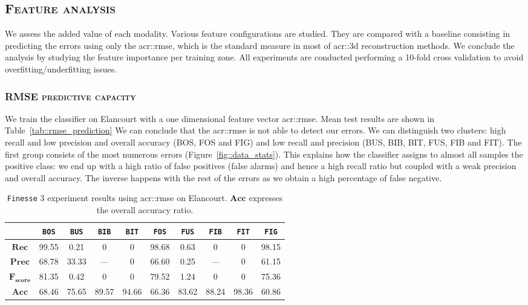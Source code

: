     \subsection{\textsc{Feature analysis}}
        We assess the added value of each modality. Various feature configurations are studied.
        They are compared with a baseline consisting in predicting the errors using only the \gls{acr::rmse}, which is the standard measure in most of \gls{acr::3d} reconstruction methods.
        We conclude the analysis by studying the feature importance per training zone.
        All experiments are conducted performing a 10-fold cross validation to avoid overfitting/underfitting issues.

        \subsubsection{\textsc{RMSE predictive capacity}}
            We train the classifier on Elancourt with a one dimensional feature vector \gls{acr::rmse}. Mean test results are shown in Table~\ref{tab::rmse_prediction} We can conclude that the \gls{acr::rmse} is not able to detect our  errors.  We can distinguish two clusters: high recall and low precision and overall accuracy (BOS, FOS and FIG) and low recall and precision (BUS, BIB, BIT, FUS, FIB and FIT). The first group consists of the most numerous errors (Figure~\ref{fig::data_stats}). This explains how the classifier assigns to almost all samples the positive class: we end up with a high ratio of false positives (false alarms) and hence a high recall ratio but coupled with a weak precision and overall accuracy. The inverse happens with the rest of the errors as we obtain a high percentage of false negative.
            \begin{table}[h]
                \begin{tabular}{c c c c c c c c c c}
                    \toprule
                    & \texttt{BOS} & \texttt{BUS} & \texttt{BIB} & \texttt{BIT} & \texttt{FOS} & \texttt{FUS} & \texttt{FIB} & \texttt{FIT} & \texttt{FIG} \\
                    \midrule
                    $\bm{Rec}$ & 99.55 & 0.21 & 0 & 0 & 98.68 & 0.63 & 0 & 0 & 98.15 \\
                    \midrule
                    $\bm{Prec}$ & 68.78 & 33.33 & --- & 0 & 66.60 & 0.25 & --- & 0 & 61.15 \\
                    \midrule
                    $\bm{F_{score}}$ & 81.35 & 0.42 & 0 & 0 & 79.52 & 1.24 & 0 & 0 & 75.36 \\
                    \midrule
                    $\bm{Acc}$ & 68.46 & 75.65 & 89.57 & 94.66 & 66.36 & 83.62 & 88.24 & 98.36 & 60.86 \\
                    \bottomrule
                \end{tabular}
                \caption{
                    \label{tab::rmse} \texttt{Finesse} 3 experiment results using \gls{acr::rmse} on Elancourt.
                    $\bm{Acc}$ expresses the overall accuracy ratio.
                }
            \end{table}

